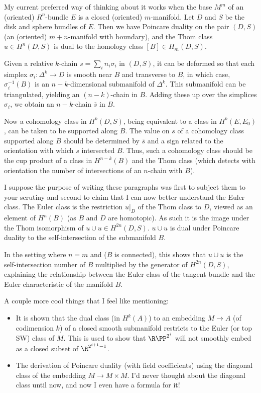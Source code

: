 \documentclass[11pt]{article}
\begin{document}
\begin{CharacteristicClasses}
My current preferred way of thinking about it works when the base $M^m$ of an (oriented) $R^n$-bundle $E$ is a closed (oriented) $m$-manifold. Let $D$ and $S$ be the disk and sphere bundles of $E$. Then we have Poincare duality on the pair $(D,S)$ (an (oriented) $m+n$-manifold with boundary), and the Thom class $u\in H^n(D,S)$ is dual to the homology class $[B]\in H_m(D,S)$.

Given a relative $k$-chain $s=\sum_{i}n_i\sigma_i$ in $(D,S)$, it can be deformed so that each simplex $\sigma_i:\Delta^k\to D$ is smooth near $B$ and transverse to $B$, in which case, $\sigma_i^{-1}(B)$ is an $n-k$-dimensional submanifold of $\Delta^k$. This submanifold can be triangulated, yielding an $(n-k)$-chain in $B$. Adding these up over the simplices $\sigma_i$, we obtain an $n-k$-chain $\overline s$ in $B$. 

Now a cohomology class in $H^k(D,S)$, being equivalent to a class in $H^k(E,E_0)$, can be taken to be supported along $B$. The value on $s$ of a cohomology class supported along $B$ should be determined by $\overline s$ and a sign related to the orientation with which $s$ intersected $B$. Thus, such a cohomology class should be the cup product of a class in $H^{n-k}(B)$ and the Thom class (which detects with orientation the number of intersections of an $n$-chain with $B$).

I suppose the purpose of writing these paragraphs was first to subject them to your scrutiny and second to claim that I can now better understand the Euler class. The Euler class is the restriction $u|_D$ of the Thom class to $D$, viewed as an element of $H^n(B)$ (as $B$ and $D$ are homotopic). As such it is the image under the Thom isomorphism of $u\cup u\in H^{2n}(D,S)$. $u\cup u$ is dual under Poincare duality to the self-intersection of the submanifold $B$.

In the setting where $n=m$ and ($B$ is connected), this shows that $u\cup u$ is the self-intersection number of $B$ multiplied by the generator of $H^{2n}(D,S)$, explaining the relationship between the Euler class of the tangent bundle and the Euler characteristic of the manifold $B$.

A couple more cool things that I feel like mentioning:
\begin{itemize}
\item It is shown that the dual class (in $H^k(A)$) to an embedding $M\to A$ (of codimension $k$) of a closed smooth submanifold restricts to the Euler (or top SW) class of $M$. This is used to show that $\RP^{2^i}$ will not smoothly embed as a closed subset of $\R^{2^{i+1}-1}$.
\item The derivation of Poincare duality (with field coefficients) using the diagonal class of the embedding $M\to M\times M$. I'd never thought about the diagonal class until now, and now I even have a formula for it!
\end{itemize}




\end{CharacteristicClasses}
\end{document}
